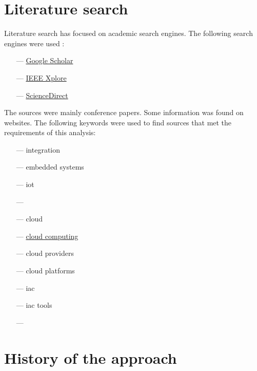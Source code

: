 \section{Literature search}

Literature search has focused on academic search engines. The following search engines were used :
\begin{itemize}
    \item[—] \href{https://scholar.google.com}{Google Scholar}
    \item[—] \href{https://ieeexplore.ieee.org/Xplore/home.jsp}{IEEE Xplore}
    \item[—] \href{https://www.sciencedirect.com}{ScienceDirect}
\end{itemize}
The sources were mainly conference papers. Some information was found on websites. The following keywords were used to find sources that met the requirements of this analysis:
\begin{itemize}
    \item[—] integration
    \item[—] embedded systems
    \item[—] \acrshort{iot}
    \item[—] 
    \item[—] \gls{cloud}
    \item[—] \hyperref[subsec:cloudcomputing]{cloud computing}
    \item[—] \gls{cloud} providers
    \item[—] \gls{cloud} platforms
    \item[—] \acrlong{iac}
    \item[—] \acrshort{iac} tools
    \item[—] 
\end{itemize}


\section{History of the \texorpdfstring{}{} approach}


